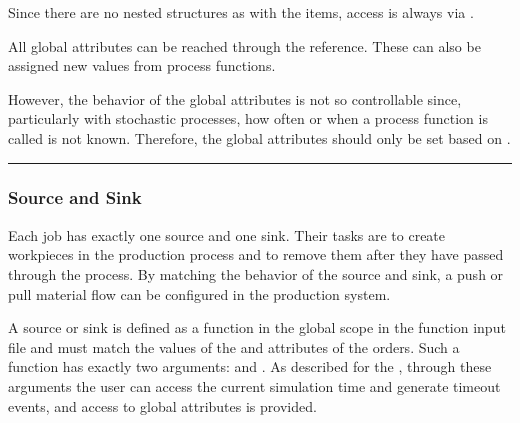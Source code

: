 \documentclass[letterpaper,10pt,english]{sphinxmanual}
\begin{document}
\sphinxAtStartPar
Since there are no nested structures as with the items, access is always via .

\sphinxAtStartPar
{}

\sphinxAtStartPar
All global attributes can be reached through the  reference. These can also be assigned new values from process
functions.

\begin{sphinxVerbatim}[commandchars=\\\{\}]
\end{sphinxVerbatim}

\sphinxAtStartPar
However, the behavior of the global attributes is not so controllable since, particularly with stochastic processes, how
often or when a process function is called is not known. Therefore, the global attributes should only be set based on
{\hyperref[\detokenize{source/Interface_files/function_file:global-function}]{}}.


\bigskip\hrule\bigskip



\subsubsection{Source and Sink}
\label{\detokenize{source/Interface_files/function_file:source-and-sink}}\label{\detokenize{source/Interface_files/function_file:source-sink}}
\sphinxAtStartPar
Each job has exactly one source and one sink. Their tasks are to create workpieces in the production process and to
remove them after they have passed through the process. By matching the behavior of the source and sink, a push or pull
material flow can be configured in the production system.

\sphinxAtStartPar
A source or sink is defined as a function in the global scope in the function input file and must match the values of
the  and  attributes of the orders. Such a function has exactly two arguments:  and . As
described for the {\hyperref[\detokenize{source/Interface_files/function_file:process-function}]{}}, through these arguments the user can access the current
simulation time and generate timeout events, and access to global attributes is provided.
\end{document}
